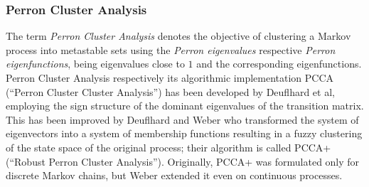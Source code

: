 \subsubsection*{Perron Cluster Analysis} %

The term \textit{Perron Cluster Analysis} denotes the objective of clustering a Markov process into metastable sets using the \textit{Perron eigenvalues} respective \textit{Perron eigenfunctions}, being eigenvalues close to $1$ and the corresponding eigenfunctions. %
Perron Cluster Analysis respectively its algorithmic implementation PCCA (``Perron Cluster Cluster Analysis'') has been developed by Deuflhard et al\cite{deuflhard2000identification}, employing the sign structure of the dominant eigenvalues of the transition matrix. %
This has been improved by Deuflhard and Weber\cite{deuflhard2005robust}
who transformed the system of eigenvectors into a system of membership functions resulting in a fuzzy clustering of the state space of the original process; their algorithm is called PCCA+
(``Robust Perron Cluster Analysis'').
Originally, PCCA+ was formulated only for discrete Markov chains, but Weber\cite{weber2011subspace} extended it even on continuous processes.
\\


